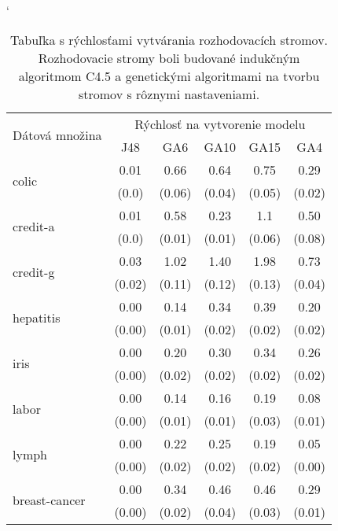 \begin{table}[t]
\catcode`
\centering 
\newcommand\T{\rule{0pt}{2.6ex}}       %
\newcommand\B{\rule[-1.2ex]{0pt}{0pt}} %
\begin{tabular}{|l||c|c|c|c|c||}
\hline \multirow{2}{*}{Dátová množina} & \multicolumn{5}{|c||}{Rýchlosť na vytvorenie modelu} \\ 
\cline{2-6} & J48 & GA6 & GA10 & GA15 & GA4 \\
\hline
\hline \multirow{2}{*}{colic} & 0.01 & 0.66 & 0.64 & 0.75 & 0.29 \T\\[-1.5ex]
& \tiny (0.0) & \tiny (0.06) & \tiny (0.04) & \tiny (0.05) & \tiny (0.02)\B\\
\hline \multirow{2}{*}{credit-a} & 0.01 & 0.58 & 0.23 & 1.1 & 0.50 \T\\[-1.5ex]
& \tiny (0.0) & \tiny (0.01) & \tiny (0.01) & \tiny (0.06) & \tiny (0.08)\B\\
\hline \multirow{2}{*}{credit-g} & 0.03 & 1.02 & 1.40 & 1.98 & 0.73\T\\[-1.5ex]
& \tiny (0.02) & \tiny (0.11) & \tiny (0.12) & \tiny (0.13) & \tiny (0.04)\B\\
\hline \multirow{2}{*}{hepatitis} & 0.00 & 0.14 & 0.34 & 0.39 & 0.20 \T\\[-1.5ex]
& \tiny (0.00) & \tiny (0.01) & \tiny (0.02) & \tiny (0.02) & \tiny (0.02)\B\\
\hline \multirow{2}{*}{iris} & 0.00 & 0.20 & 0.30 & 0.34 & 0.26 \T\\[-1.5ex]
& \tiny (0.00) & \tiny (0.02) & \tiny (0.02) & \tiny (0.02) & \tiny (0.02)\B\\
\hline \multirow{2}{*}{labor} & 0.00 & 0.14 & 0.16 & 0.19 & 0.08 \T\\[-1.5ex]
& \tiny (0.00) & \tiny (0.01) & \tiny (0.01) & \tiny (0.03) & \tiny (0.01)\B\\
\hline \multirow{2}{*}{lymph} & 0.00 & 0.22 & 0.25 & 0.19 & 0.05 \T\\[-1.5ex]
& \tiny (0.00) & \tiny (0.02) & \tiny (0.02) & \tiny (0.02) & \tiny (0.00)\B\\
\hline \multirow{2}{*}{breast-cancer} & 0.00 & 0.34 & 0.46 & 0.46 & 0.29 \T\\[-1.5ex]
& \tiny (0.00) & \tiny (0.02) & \tiny (0.04) & \tiny (0.03) & \tiny (0.01)\B\\
\hline
\end{tabular}
\caption{Tabuľka s rýchlosťami vytvárania rozhodovacích stromov. Rozhodovacie stromy boli budované indukčným algoritmom C4.5 a genetickými algoritmami na tvorbu stromov s rôznymi nastaveniami.}\label{fig:time}
\end{table}

